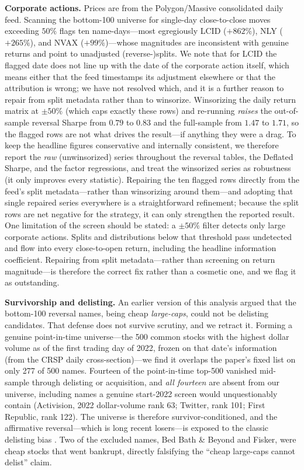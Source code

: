 \documentclass[11pt]{article}
\begin{document}
\textbf{Corporate actions.} Prices are from the Polygon/Massive consolidated daily feed. Scanning the bottom-100 universe for single-day close-to-close moves exceeding $50\%$ flags ten name-days---most egregiously LCID ($+862\%$), NLY ($+265\%$), and NVAX ($+99\%$)---whose magnitudes are inconsistent with genuine returns and point to unadjusted (reverse-)splits. We note that for LCID the flagged date does not line up with the date of the corporate action itself, which means either that the feed timestamps its adjustment elsewhere or that the attribution is wrong; we have not resolved which, and it is a further reason to repair from split metadata rather than to winsorize. Winsorizing the daily return matrix at $\pm50\%$ (which caps exactly these rows) and re-running \emph{raises} the out-of-sample reversal Sharpe from $0.79$ to $0.83$ and the full-sample from $1.47$ to $1.71$, so the flagged rows are not what drives the result---if anything they were a drag. To keep the headline figures conservative and internally consistent, we therefore report the \emph{raw} (unwinsorized) series throughout the reversal tables, the Deflated Sharpe, and the factor regressions, and treat the winsorized series as robustness (it only improves every statistic). Repairing the ten flagged rows directly from the feed's split metadata---rather than winsorizing around them---and adopting that single repaired series everywhere is a straightforward refinement; because the split rows are net negative for the strategy, it can only strengthen the reported result. One limitation of the screen should be stated: a $\pm50\%$ filter detects only large corporate actions. Splits and distributions below that threshold pass undetected and flow into every close-to-open return, including the headline information coefficient. Repairing from split metadata---rather than screening on return magnitude---is therefore the correct fix rather than a cosmetic one, and we flag it as outstanding.

\textbf{Survivorship and delisting.} An earlier version of this analysis argued that the bottom-100 reversal names, being cheap \emph{large-caps}, could not be delisting candidates. That defense does not survive scrutiny, and we retract it. Forming a genuine point-in-time universe---the 500 common stocks with the highest dollar volume as of the first trading day of 2022, frozen on that date's information (from the CRSP daily cross-section)---we find it overlaps the paper's fixed list on only 277 of 500 names. Fourteen of the point-in-time top-500 vanished mid-sample through delisting or acquisition, and \emph{all fourteen} are absent from our universe, including names a genuine start-2022 screen would unquestionably contain (Activision, 2022 dollar-volume rank 63; Twitter, rank 101; First Republic, rank 122). The universe is therefore survivor-conditioned, and the affirmative reversal---which is long recent losers---is exposed to the classic delisting bias \citep{shumway1997}. Two of the excluded names, Bed Bath \& Beyond and Fisker, were cheap stocks that went bankrupt, directly falsifying the ``cheap large-caps cannot delist'' claim.
\end{document}
